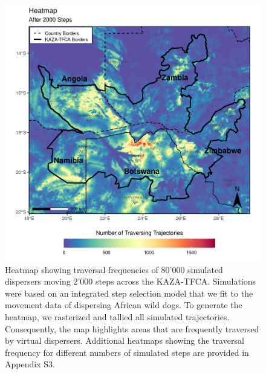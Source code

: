 \documentclass[abstract=on,10pt,a4paper,bibliography=totocnumbered]{article}
\begin{document}
\begin{figure}
  \includegraphics[width=\textwidth]{99_Heatmap.png}
  \caption{Heatmap showing traversal frequencies of 80'000 simulated dispersers
  moving 2'000 steps across the KAZA-TFCA. Simulations were based on an
  integrated step selection model that we fit to the movement data of dispersing
  African wild dogs. To generate the heatmap, we rasterized and tallied all
  simulated trajectories. Consequently, the map highlights areas that are
  frequently traversed by virtual dispersers. Additional heatmaps showing the
  traversal frequency for different numbers of simulated steps are provided in
  Appendix S3.}
  \label{Heatmap}
\end{figure}
\end{document}
